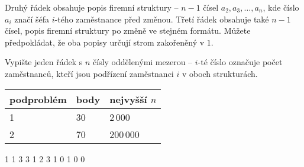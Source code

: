 Druhý řádek obsahuje popis firemní struktury -- $n-1$ čísel $a_2, a_3, \ldots, a_n$, kde
číslo $a_i$ značí šéfa $i$-tého zaměstnance před změnou. Třetí řádek obsahuje také $n-1$
čísel, popis firemní struktury po změně ve stejném formátu. Můžete předpokládat, že oba
popisy určují strom zakořeněný v $1$.


Vypište jeden řádek s $n$ čísly oddělenými mezerou -- $i$-té číslo označuje počet
zaměstnanců, kteří jsou podřízení zaměstnanci $i$ v oboch strukturách.


\centering
\begin{tabular}{|l|l|l|}
\hline
podproblém & body & nejvyšší $n$  \\ \hline
1       & 30     & 2\,000          \\ \hline
2       & 70     & 200\,000        \\ \hline
\end{tabular}


1 1 3 3
1 2 3 1
 0 1 0 0 
\sampleEND


